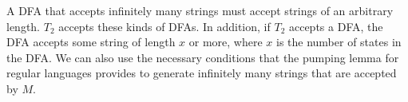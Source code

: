 \documentclass[11pt letter]{article}
\begin{document}
A DFA that accepts infinitely many strings must accept strings of an arbitrary length. $T_{2}$ accepts these kinds of DFAs. In addition, if $T_{2}$ accepts a DFA, the DFA accepts some string of length $x$ or more, where $x$ is the number of states in the DFA. We can also use the necessary conditions that the pumping lemma for regular languages provides to generate infinitely many strings that are accepted by $M$.
\end{document}
